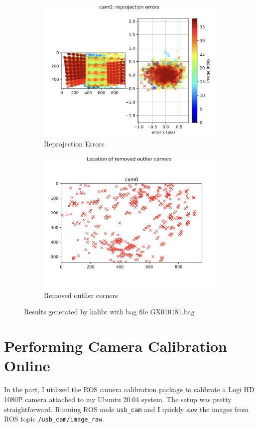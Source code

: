 \documentclass[11pt, oneside]{article}   	%
\begin{document}
\begin{figure}[ht]
\begin{subfigure}[b]{0.3\textwidth}
\includegraphics[width=\textwidth]{imgs/kalibr5.png}
\caption{Reprojection Errors}
\end{subfigure}
\begin{subfigure}[b]{0.3\textwidth}
\includegraphics[width=\textwidth]{imgs/kalibr6.png}
\caption{Removed outlier corners}
\end{subfigure}

\caption{Results generated by kalibr with bag file GX010181.bag}
\label{fig.1}
\end{figure}

\newpage
\section{Performing Camera Calibration Online}
In the part, I utilized the ROS camera calibration package to calibrate a Logi HD 1080P camera attached to my Ubuntu 20.04 system. The setup was pretty straightforward. Running ROS node \verb+usb_cam+ and I quickly saw the images from ROS topic \verb+/usb_cam/image_raw+.
\end{document}
